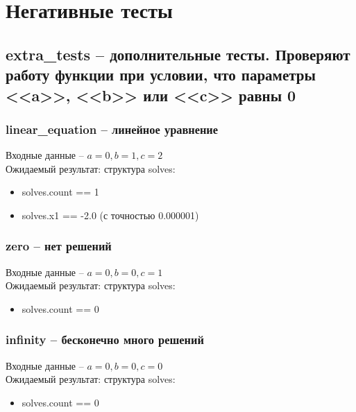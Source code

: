 \documentclass{article}
\begin{document}
\section{Негативные тесты}
\subsection{extra\_tests -- дополнительные тесты. Проверяют работу функции при условии, что параметры <<a>>, <<b>> или <<c>> равны 0}
\subsubsection{linear\_equation -- линейное уравнение}
Входные данные -- $a=0, b=1, c=2$\\
Ожидаемый результат: структура solves:
\begin{itemize}
    \item solves.count == 1
    \item solves.x1 == -2.0 (с точностью 0.000001)
\end{itemize}
\subsubsection{zero -- нет решений}
Входные данные -- $a=0, b=0, c=1$\\
Ожидаемый результат: структура solves:
\begin{itemize}
    \item solves.count == 0
\end{itemize}
\subsubsection{infinity -- бесконечно много решений}
Входные данные -- $a=0, b=0, c=0$\\
Ожидаемый результат: структура solves:
\begin{itemize}
    \item solves.count == 0
\end{itemize}
\end{document}
